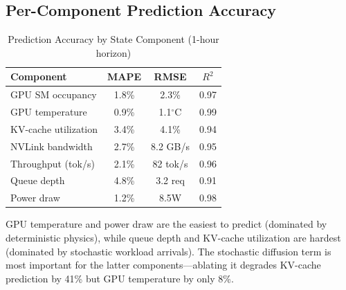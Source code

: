 \documentclass[conference,10pt]{IEEEtran}
\begin{document}
\begin{table}[!htbp]
\caption{Operational Metrics (90-Day Deployment)}
\label{tab:e2e}
\centering\scriptsize
{}
\end{table}


\subsection{Per-Component Prediction Accuracy}

\begin{table}[!htbp]
\caption{Prediction Accuracy by State Component (1-hour horizon)}
\label{tab:percomp}
\centering\scriptsize
\begin{tabular}{@{}lccc@{}}
\toprule
\textbf{Component} & \textbf{MAPE} & \textbf{RMSE} & \textbf{$R^2$} \\
\midrule
GPU SM occupancy & 1.8\% & 2.3\% & 0.97 \\
GPU temperature & 0.9\% & 1.1$^\circ$C & 0.99 \\
KV-cache utilization & 3.4\% & 4.1\% & 0.94 \\
NVLink bandwidth & 2.7\% & 8.2 GB/s & 0.95 \\
Throughput (tok/s) & 2.1\% & 82 tok/s & 0.96 \\
Queue depth & 4.8\% & 3.2 req & 0.91 \\
Power draw & 1.2\% & 8.5W & 0.98 \\
\bottomrule
\end{tabular}
\end{table}

GPU temperature and power draw are the easiest to predict (dominated by deterministic physics), while queue depth and KV-cache utilization are hardest (dominated by stochastic workload arrivals). The stochastic diffusion term is most important for the latter components---ablating it degrades KV-cache prediction by 41\% but GPU temperature by only 8\%.
\end{document}
